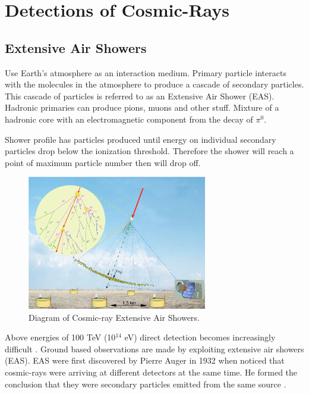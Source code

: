 \chapter[Detection of Cosmic-rays]{\centering Detections of Cosmic-Rays \\}\label{Ch:CR_Detection}

\section{Extensive Air Showers}

Use Earth's atmosphere as an interaction medium.
Primary particle interacts with the molecules in the atmosphere to produce a cascade of secondary particles. This cascade of particles is referred to as an Extensive Air Shower (EAS).
Hadronic primaries can produce pions, muons and other stuff.
Mixture of a hadronic core with an electromagnetic component from the decay of $\pi^{0}$.

Shower profile has particles produced until energy on individual secondary particles drop below the ionization threshold. Therefore the shower will reach a point of maximum particle number then will drop off.

\begin{figure}
\centering
\includegraphics[width=0.7\textwidth]{chapters/pix/CR_ExtensiveAirShowers.png}
\caption{Diagram of Cosmic-ray Extensive Air Showers.}
\end{figure}

Above energies of 100 TeV (10$^{14}$ eV) direct detection becomes increasingly difficult \cite{RevModPhys.71.S165}. Ground based observations are made by exploiting extensive air showers (EAS). EAS were first discovered by Pierre Auger in 1932 when noticed that cosmic-rays were arriving at different detectors at the same time. He formed the conclusion that they were secondary particles emitted from the same source \cite{RevModPhys.11.288}.

